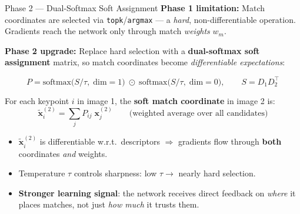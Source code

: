 \documentclass[aspectratio=169, 12pt]{beamer}
\begin{document}
\begin{frame}{Phase 2 --- Dual-Softmax Soft Assignment}
\small
\textbf{Phase 1 limitation:} Match coordinates are selected via \texttt{topk}/\texttt{argmax}
--- a \emph{hard}, non-differentiable operation.  Gradients reach the network
only through match \emph{weights} $w_m$.

\smallskip
\textbf{Phase 2 upgrade:} Replace hard selection with a \textbf{dual-softmax soft
assignment} matrix, so match coordinates become \emph{differentiable expectations}:

\vspace{-0.3em}
\[
    P = \mathrm{softmax}\!\bigl(S/\tau,\;\text{dim}=1\bigr)
      \;\odot\;
      \mathrm{softmax}\!\bigl(S/\tau,\;\text{dim}=0\bigr),
    \qquad S = D_1 D_2^\top
\]
\vspace{-0.8em}

For each keypoint $i$ in image 1, the \textbf{soft match coordinate} in image 2 is:
\vspace{-0.3em}
\[
    \tilde{\mathbf{x}}^{(2)}_i = \sum_{j} P_{ij} \; \mathbf{x}^{(2)}_j
    \qquad \text{(weighted average over all candidates)}
\]
\vspace{-0.5em}
\begin{itemize}\setlength{\itemsep}{2pt}
    \item $\tilde{\mathbf{x}}^{(2)}_i$ is differentiable w.r.t.\ descriptors
          $\Rightarrow$ gradients flow through \textbf{both} coordinates \emph{and} weights.
    \item Temperature $\tau$ controls sharpness: low $\tau \to$ nearly hard selection.
    \item \textbf{Stronger learning signal}: the network receives direct feedback on
          \emph{where} it places matches, not just \emph{how much} it trusts them.
\end{itemize}
\end{frame}
\end{document}
